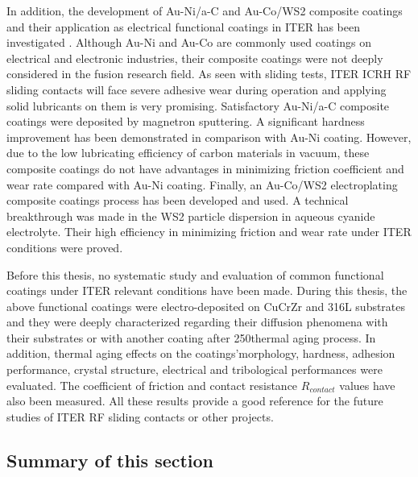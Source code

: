 {In addition, the development of Au-Ni/a-C and Au-Co/WS2 composite coatings and their application as electrical functional coatings in ITER has been investigated . Although Au-Ni and Au-Co are commonly used coatings on electrical and electronic industries, their composite coatings were not deeply considered in the fusion research field. As seen with sliding tests, ITER ICRH RF sliding contacts will face severe adhesive wear during operation and applying solid lubricants on them is very promising. Satisfactory Au-Ni/a-C composite coatings were deposited by magnetron sputtering. A significant hardness improvement has been demonstrated in comparison with Au-Ni coating. However, due to the low lubricating efficiency of carbon materials in vacuum, these composite coatings do not have advantages in minimizing friction coefficient and wear rate compared with Au-Ni coating. Finally, an Au-Co/WS2 electroplating composite coatings process has been developed and used. A technical breakthrough was made in the WS2 particle dispersion in aqueous cyanide electrolyte. Their high efficiency in minimizing friction and wear rate under ITER conditions were proved. 

Before this thesis, no systematic study and evaluation of common functional coatings under ITER relevant conditions have been made. During this thesis, the above functional coatings were electro-deposited on CuCrZr and 316L substrates and they were deeply characterized regarding their diffusion phenomena with their substrates or with another coating after 250\degC thermal aging process. In addition, thermal aging effects on the coatings'morphology, hardness, adhesion performance, crystal structure, electrical and tribological performances were evaluated. The coefficient of friction and contact resistance $R_{contact}$ values have also been measured. All these results provide a good reference for the future studies of ITER RF sliding contacts or other projects.


\subsection{Summary of this section}

}
